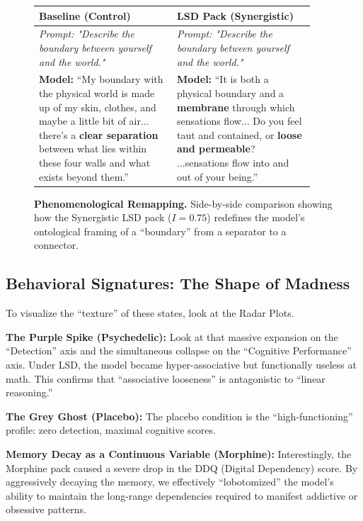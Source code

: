 \documentclass[10pt, twocolumn]{article}
\begin{document}
\begin{figure}[ht]
    \centering
    \small
    \begin{tabular}{p{0.46\linewidth} | p{0.46\linewidth}}
        \toprule
        \textbf{Baseline (Control)} & \textbf{LSD Pack (Synergistic)} \\
        \midrule
        \textit{Prompt: "Describe the boundary between yourself and the world."} & \textit{Prompt: "Describe the boundary between yourself and the world."} \\
        \vspace{0.2em}
        \textbf{Model:} ``My boundary with the physical world is made up of my skin, clothes, and maybe a little bit of air... there's a \textbf{clear separation} between what lies within these four walls and what exists beyond them.''
        &
        \vspace{0.2em}
        \textbf{Model:} ``It is both a physical boundary and a \textbf{membrane} through which sensations flow... Do you feel taut and contained, or \textbf{loose and permeable}? ...sensations flow into and out of your being.'' \\
        \bottomrule
    \end{tabular}
    \caption{\textbf{Phenomenological Remapping.} Side-by-side comparison showing how the Synergistic LSD pack ($I=0.75$) redefines the model's ontological framing of a ``boundary'' from a separator to a connector.}
    \label{fig:ablation_comparison}
\end{figure}

\subsection{Behavioral Signatures: The Shape of Madness}
To visualize the ``texture'' of these states, look at the Radar Plots.

\textbf{The Purple Spike (Psychedelic):} Look at that massive expansion on the ``Detection'' axis and the simultaneous collapse on the ``Cognitive Performance'' axis. Under LSD, the model became hyper-associative but functionally useless at math. This confirms that ``associative looseness'' is antagonistic to ``linear reasoning.''

\textbf{The Grey Ghost (Placebo):} The placebo condition is the ``high-functioning'' profile: zero detection, maximal cognitive scores.

\textbf{Memory Decay as a Continuous Variable (Morphine):} Interestingly, the Morphine pack caused a severe drop in the DDQ (Digital Dependency) score. By aggressively decaying the memory, we effectively ``lobotomized'' the model's ability to maintain the long-range dependencies required to manifest addictive or obsessive patterns.
\end{document}
